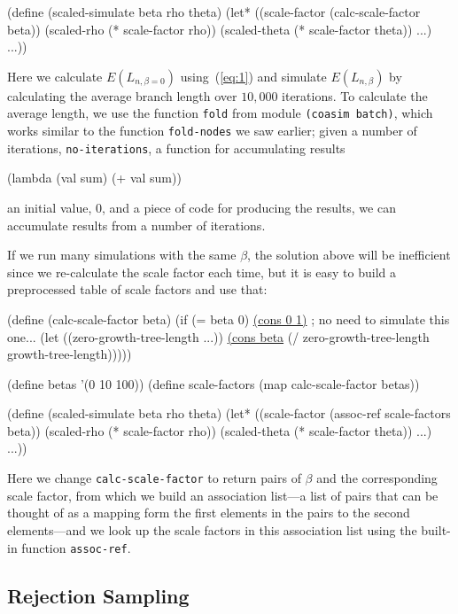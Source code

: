 \documentclass{manual}
\begin{document}
\begin{empfile}
\begin{code}
(define (scaled-simulate beta rho theta)
  (let* ((scale-factor   (calc-scale-factor beta))
         (scaled-rho     (* scale-factor rho))
         (scaled-theta   (* scale-factor theta))
         ...)
    ...))
\end{code}
Here we calculate $E(L_{n,\beta=0})$ using~(\ref{eq:1}) and simulate
$E(L_{n,\beta})$ by calculating the average branch length over
$10,000$ iterations.  To calculate the average length, we use the
function \texttt{fold} from module \texttt{(coasim batch)}, which
works similar to the function \texttt{fold-nodes} we saw earlier;
given a number of iterations, \texttt{no-iterations}, a function for
accumulating results 
\begin{code}
  (lambda (val sum) (+ val sum))
\end{code}
an initial value, $0$, and a piece of code for producing the results,
we can accumulate results from a number of iterations.

If we run many simulations with the same $\beta$, the solution above
will be inefficient since we re-calculate the scale factor each time,
but it is easy to build a preprocessed table of scale factors and use
that:
\begin{code}
(define (calc-scale-factor beta)
  (if (= beta 0) \underline{(cons 0 1)} ; no need to simulate this one...
      (let ((zero-growth-tree-length
              ...))
        \underline{(cons beta} (/ zero-growth-tree-length growth-tree-length)))))

(define betas '(0 10 100))
(define scale-factors (map calc-scale-factor betas))

(define (scaled-simulate beta rho theta)
  (let* ((scale-factor   (assoc-ref scale-factors beta))
         (scaled-rho     (* scale-factor rho))
         (scaled-theta   (* scale-factor theta))
         ...)
    ...))
\end{code}
Here we change \texttt{calc-scale-factor} to return pairs of $\beta$
and the corresponding scale factor, from which we build an association
list---a list of pairs that can be thought of as a mapping form the
first elements in the pairs to the second elements---and we look up
the scale factors in this association list using the built-in function
\texttt{assoc-ref}.
  

\subsection{Rejection Sampling}
\label{sec:rejection-sampling}


\end{empfile}
\end{document}
